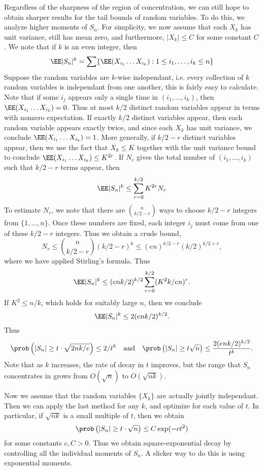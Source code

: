 Regardless of the sharpness of the region of concentration, we can still hope to obtain sharper results for the tail bounds of random variables. To do this, we analyze higher moments of $S_n$. For simplicity, we now assume that each $X_k$ has unit variance, still has mean zero, and furthermore, $|X_k| \leq C$ for some constant $C$. We note that if $k$ is an even integer, then
%
\[ \EE |S_n|^k = \sum \{ \EE(X_{i_1} \dots X_{i_k}) : 1 \leq i_1, \dots, i_k \leq n \} \]
%
Suppose the random variables are $k$-wise independant, i.e. every collection of $k$ random variables is independant from one another, this is fairly easy to calculate. Note that if some $i_j$ appears only a single time in $(i_1, \dots, i_k)$, then $\EE(X_{i_1} \dots X_{i_k}) = 0$. Thus at most $k/2$ distinct random variables appear in terms with nonzero expectation. If exactly $k/2$ distinct variables appear, then each random variable appears exactly twice, and since each $X_k$ has unit variance, we conclude $\EE(X_{i_1} \dots X_{i_k}) = 1$. More generally, if $k/2 - r$ distinct variables appear, then we use the fact that $X_k \leq K$ together with the unit variance bound to conclude $\EE(X_{i_1} \dots X_{i_k}) \leq K^{2r}$. If $N_r$ gives the total number of $(i_1, \dots, i_k)$ such that $k/2 - r$ terms appear, then
%
\[ \EE|S_n|^k \leq \sum_{r = 0}^{k/2} K^{2r} N_r \]
%
To estimate $N_r$, we note that there are ${n \choose k/2 - r}$ ways to choose $k/2 - r$ integers from $\{ 1, \dots, n \}$. Once these numbers are fixed, each integer $i_j$ must come from one of these $k/2 - r$ integers. Thus we obtain a crude bound,
%
\[ N_r \leq {n \choose k/2 - r} (k/2 - r)^k \leq (en)^{k/2 - r}(k/2)^{k/2 + r}, \]
%
where we have applied Stirling's formula. Thus
%
\[ \EE |S_n|^k \leq (enk/2)^{k/2} \sum_{r = 0}^{k/2} (K^2 k / en)^r. \]
%
If $K^2 \leq n/k$, which holds for suitably large $n$, then we conclude
%
\[ \EE|S_n|^k \leq 2(enk/2)^{k/2}. \]
%
Thus
%
\[ \prob \left( |S_n| \geq t \cdot \sqrt{2nk/e} \right) \leq 2 / t^k\quad\text{and}\quad \prob \left( |S_n| \geq t \sqrt{n} \right) \leq \frac{2(enk/2)^{k/2}}{t^k}. \]
%
Note that as $k$ increases, the rate of decay in $t$ improves, but the range that $S_n$ concentrates in grows from $O(\sqrt{n})$ to $O(\sqrt{nk})$.

Now we assume that the random variables $\{ X_k \}$ are actually jointly independant. Then we can apply the last method for any $k$, and optimize for each value of $t$. In particular, if $\sqrt{nk}$ is a small multiple of $t$, then we obtain
%
\[ \prob \left( |S_n| \geq t \cdot \sqrt{n} \right) \leq C \exp(-ct^2) \]
%
for some constants $c,C > 0$. Thus we obtain square-exponential decay by controlling all the individual moments of $S_n$. A slicker way to do this is using exponential moments.

